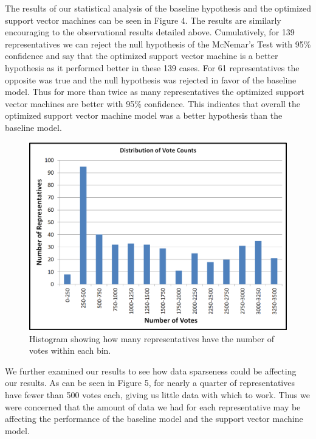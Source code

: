 \documentclass[11pt,letterpaper,twocolumn]{article}
\begin{document}
The results of our statistical analysis of the baseline hypothesis and the optimized support vector machines  can be seen in Figure 4. The results are similarly encouraging to the observational results detailed above. Cumulatively, for 139 representatives we can reject the null hypothesis of the McNemar's Test with 95\% confidence and say that the optimized support vector machine is a better hypothesis as it performed better in these 139 cases. For 61 representatives the opposite was true and the null hypothesis was rejected in favor of the baseline model. Thus for more than twice as many representatives the optimized support vector machines are better with 95\% confidence. This indicates that overall the optimized support vector machine model was a better hypothesis than the baseline model.

\begin{figure}
\includegraphics[width=\columnwidth]{data_distribution.png}
\caption{Histogram showing how many representatives have the number of votes within each bin.}
\end{figure}

We further examined our results to see how data sparseness could be affecting our results. As can be seen in Figure 5, for nearly a quarter of representatives have fewer than 500 votes each, giving us little data with which to work. Thus we were concerned that the amount of data we had for each representative may be affecting the performance of the baseline model and the support vector machine model.
\end{document}
